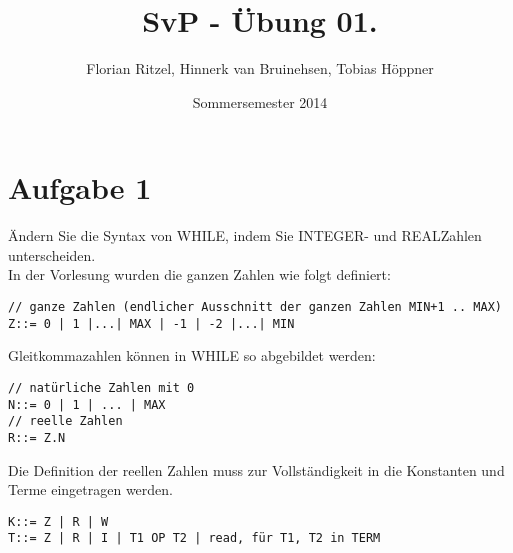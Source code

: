 \documentclass[ngerman,a4paper]{report}
\author{Florian Ritzel, Hinnerk van Bruinehsen, Tobias Höppner}
\title{SvP - Übung 01. }
\date{Sommersemester 2014}
\renewcommand{\maketitle}{}
\begin{document}
 
\maketitle 
\section*{Aufgabe 1}
Ändern Sie die Syntax von WHILE, indem Sie INTEGER- und REALZahlen unterscheiden.\\
In der Vorlesung wurden die ganzen Zahlen wie folgt definiert:
\begin{lstlisting}
// ganze Zahlen (endlicher Ausschnitt der ganzen Zahlen MIN+1 .. MAX)
Z::= 0 | 1 |...| MAX | -1 | -2 |...| MIN 
\end{lstlisting}
Gleitkommazahlen können in WHILE so abgebildet werden:
\begin{lstlisting}
// natürliche Zahlen mit 0
N::= 0 | 1 | ... | MAX
// reelle Zahlen
R::= Z.N
\end{lstlisting}
Die Definition der reellen Zahlen muss zur Vollständigkeit in die Konstanten und Terme eingetragen werden.
\begin{lstlisting}
K::= Z | R | W
T::= Z | R | I | T1 OP T2 | read, für T1, T2 in TERM
\end{lstlisting}
\end{document}
